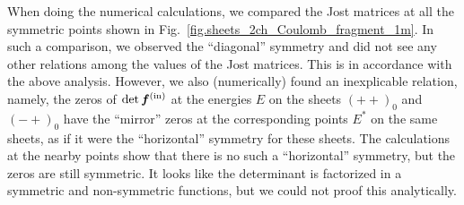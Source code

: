\documentclass[12pt]{article}
\begin{document}
When doing the numerical calculations, we compared the Jost matrices at 
all the symmetric points shown in 
Fig.~\ref{fig.sheets_2ch_Coulomb_fragment_1m}. In such a 
comparison, we observed the ``diagonal'' symmetry and did not see any other 
relations among the values of the Jost matrices. This is in accordance with the 
above analysis. However, we also (numerically) found an inexplicable relation, 
namely, the zeros of $\det\bm{f}^{\rm(in)}$ at the energies $E$ on the sheets 
$(++)_0$ and $(-+)_0$ have the ``mirror'' zeros at the corresponding points 
$E^*$ on the same sheets, as if it were the ``horizontal'' symmetry for these 
sheets. The calculations at the nearby points show that there is no such a 
``horizontal'' symmetry, but the zeros are still symmetric. It looks like the 
determinant is factorized in a symmetric and non-symmetric functions, but we 
could not proof this analytically.
\end{document}
